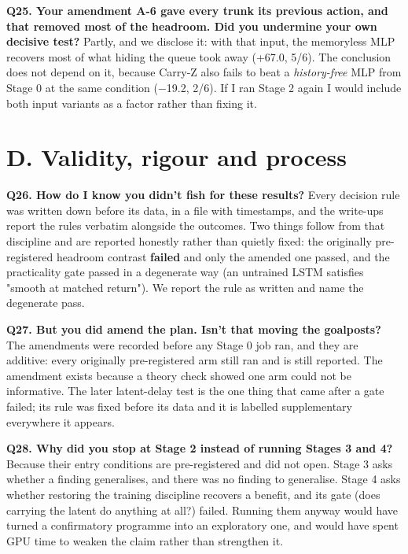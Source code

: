 \documentclass[11pt]{article}
\begin{document}
\textbf{Q25. Your amendment A-6 gave every trunk its previous action, and that removed most of the headroom. Did you undermine your own decisive test?} Partly, and we disclose it: with that input, the memoryless MLP recovers most of what hiding the queue took away (+67.0, 5/6). The conclusion does not depend on it, because Carry-Z also fails to beat a \emph{history-free} MLP from Stage 0 at the same condition ($-$19.2, 2/6). If I ran Stage 2 again I would include both input variants as a factor rather than fixing it.



\section*{D. Validity, rigour and process}



\textbf{Q26. How do I know you didn't fish for these results?} Every decision rule was written down before its data, in a file with timestamps, and the write-ups report the rules verbatim alongside the outcomes. Two things follow from that discipline and are reported honestly rather than quietly fixed: the originally pre-registered headroom contrast \textbf{failed} and only the amended one passed, and the practicality gate passed in a degenerate way (an untrained LSTM satisfies "smooth at matched return"). We report the rule as written and name the degenerate pass.



\textbf{Q27. But you did amend the plan. Isn't that moving the goalposts?} The amendments were recorded before any Stage 0 job ran, and they are additive: every originally pre-registered arm still ran and is still reported. The amendment exists because a theory check showed one arm could not be informative. The later latent-delay test is the one thing that came after a gate failed; its rule was fixed before its data and it is labelled supplementary everywhere it appears.



\textbf{Q28. Why did you stop at Stage 2 instead of running Stages 3 and 4?} Because their entry conditions are pre-registered and did not open. Stage 3 asks whether a finding generalises, and there was no finding to generalise. Stage 4 asks whether restoring the training discipline recovers a benefit, and its gate (does carrying the latent do anything at all?) failed. Running them anyway would have turned a confirmatory programme into an exploratory one, and would have spent GPU time to weaken the claim rather than strengthen it.
\end{document}
